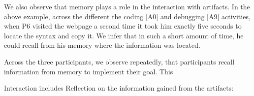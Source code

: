 We also observe that memory plays a role in the interaction with artifacts. In the above example, across the different the coding [A0] and debugging [A9] activities, when P6 visited the webpage a second time it took him exactly five seconds to locate the syntax and copy it. We infer that in such a short amount of time, he could recall from his memory where the information was located. 

Across the three participants, we observe repeatedly, that participants recall information from memory to implement their goal. This 



Interaction includes Reflection on the information gained from the artifacts:

